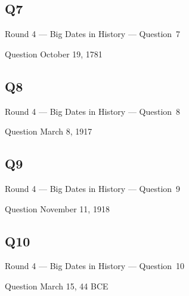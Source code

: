 \documentclass[11pt]{beamer}
\begin{document}
\subsection*{Q7}
\begin{frame}[t]{Round 4 --- Big Dates in History --- \mbox{Question 7}}
\begin{block}{Question}
October 19, 1781
\end{block}
\end{frame}
\subsection*{Q8}
\begin{frame}[t]{Round 4 --- Big Dates in History --- \mbox{Question 8}}
\begin{block}{Question}
March 8, 1917
\end{block}
\end{frame}
\subsection*{Q9}
\begin{frame}[t]{Round 4 --- Big Dates in History --- \mbox{Question 9}}
\begin{block}{Question}
November 11, 1918
\end{block}
\end{frame}
\subsection*{Q10}
\begin{frame}[t]{Round 4 --- Big Dates in History --- \mbox{Question 10}}
\begin{block}{Question}
March 15, 44 BCE
\end{block}
\end{frame}
\end{document}
